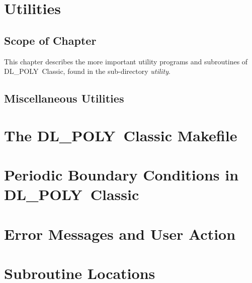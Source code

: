 \documentclass[11pt,a4paper,dvipdfm]{report}
\newcommand{\D}{\mbox{DL\_POLY Classic}}
\begin{document}
\chapter{Utilities}
\label{utility}
\setcounter{equation}{0}
\newpage
\section*{Scope of Chapter}
This chapter describes the more important utility programs and
subroutines of \D{}, found in the sub-directory {\em utility}. 

\section{Miscellaneous Utilities}


\clearpage
{}



\clearpage
\appendix
{}


\chapter{The \D{} Makefile}

\chapter{Periodic Boundary Conditions in \D{}}

\chapter{Error Messages and User Action}

\chapter{Subroutine Locations}


\clearpage
{}
\printindex
\end{document}

